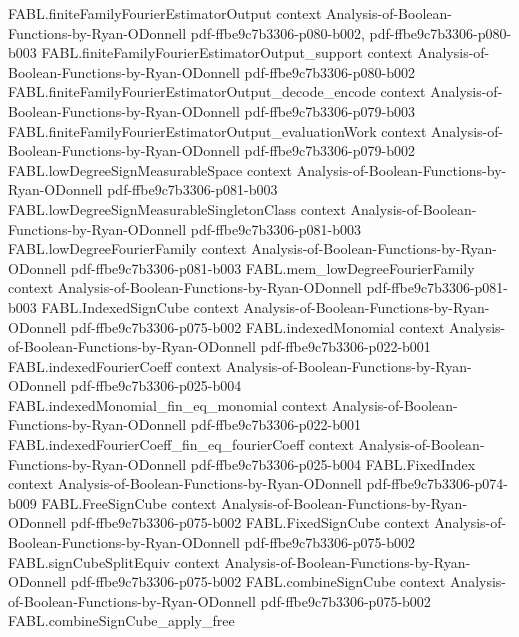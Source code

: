 \begin{theorem}
\proofstep
  {FABL.finiteFamilyFourierEstimatorOutput}
  {context}
  {Analysis-of-Boolean-Functions-by-Ryan-ODonnell}
  {pdf-ffbe9c7b3306-p080-b002,
    pdf-ffbe9c7b3306-p080-b003}
\proofstep
  {FABL.finiteFamilyFourierEstimatorOutput_support}
  {context}
  {Analysis-of-Boolean-Functions-by-Ryan-ODonnell}
  {pdf-ffbe9c7b3306-p080-b002}
\proofstep
  {FABL.finiteFamilyFourierEstimatorOutput_decode_encode}
  {context}
  {Analysis-of-Boolean-Functions-by-Ryan-ODonnell}
  {pdf-ffbe9c7b3306-p079-b003}
\proofstep
  {FABL.finiteFamilyFourierEstimatorOutput_evaluationWork}
  {context}
  {Analysis-of-Boolean-Functions-by-Ryan-ODonnell}
  {pdf-ffbe9c7b3306-p079-b002}
\proofstep
  {FABL.lowDegreeSignMeasurableSpace}
  {context}
  {Analysis-of-Boolean-Functions-by-Ryan-ODonnell}
  {pdf-ffbe9c7b3306-p081-b003}
\proofstep
  {FABL.lowDegreeSignMeasurableSingletonClass}
  {context}
  {Analysis-of-Boolean-Functions-by-Ryan-ODonnell}
  {pdf-ffbe9c7b3306-p081-b003}
\proofstep
  {FABL.lowDegreeFourierFamily}
  {context}
  {Analysis-of-Boolean-Functions-by-Ryan-ODonnell}
  {pdf-ffbe9c7b3306-p081-b003}
\proofstep
  {FABL.mem_lowDegreeFourierFamily}
  {context}
  {Analysis-of-Boolean-Functions-by-Ryan-ODonnell}
  {pdf-ffbe9c7b3306-p081-b003}
\proofstep
  {FABL.IndexedSignCube}
  {context}
  {Analysis-of-Boolean-Functions-by-Ryan-ODonnell}
  {pdf-ffbe9c7b3306-p075-b002}
\proofstep
  {FABL.indexedMonomial}
  {context}
  {Analysis-of-Boolean-Functions-by-Ryan-ODonnell}
  {pdf-ffbe9c7b3306-p022-b001}
\proofstep
  {FABL.indexedFourierCoeff}
  {context}
  {Analysis-of-Boolean-Functions-by-Ryan-ODonnell}
  {pdf-ffbe9c7b3306-p025-b004}
\proofstep
  {FABL.indexedMonomial_fin_eq_monomial}
  {context}
  {Analysis-of-Boolean-Functions-by-Ryan-ODonnell}
  {pdf-ffbe9c7b3306-p022-b001}
\proofstep
  {FABL.indexedFourierCoeff_fin_eq_fourierCoeff}
  {context}
  {Analysis-of-Boolean-Functions-by-Ryan-ODonnell}
  {pdf-ffbe9c7b3306-p025-b004}
\proofstep
  {FABL.FixedIndex}
  {context}
  {Analysis-of-Boolean-Functions-by-Ryan-ODonnell}
  {pdf-ffbe9c7b3306-p074-b009}
\proofstep
  {FABL.FreeSignCube}
  {context}
  {Analysis-of-Boolean-Functions-by-Ryan-ODonnell}
  {pdf-ffbe9c7b3306-p075-b002}
\proofstep
  {FABL.FixedSignCube}
  {context}
  {Analysis-of-Boolean-Functions-by-Ryan-ODonnell}
  {pdf-ffbe9c7b3306-p075-b002}
\proofstep
  {FABL.signCubeSplitEquiv}
  {context}
  {Analysis-of-Boolean-Functions-by-Ryan-ODonnell}
  {pdf-ffbe9c7b3306-p075-b002}
\proofstep
  {FABL.combineSignCube}
  {context}
  {Analysis-of-Boolean-Functions-by-Ryan-ODonnell}
  {pdf-ffbe9c7b3306-p075-b002}
\proofstep
  {FABL.combineSignCube_apply_free}

\end{theorem}
